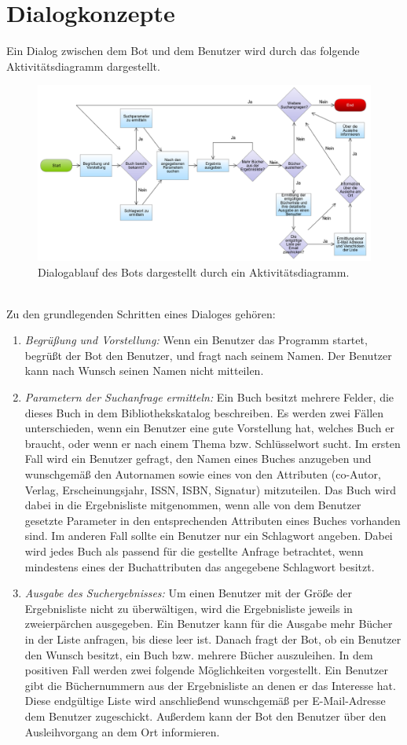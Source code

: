 \documentclass[12pt,a4paper]{scrartcl}
\begin{document}
\section{Dialogkonzepte}
Ein Dialog zwischen dem Bot und dem Benutzer wird durch das folgende Aktivitätsdiagramm dargestellt.\\
\begin{figure}[h]
\centering
  \includegraphics[width=\linewidth]{presbibo1.png}
  \caption{Dialogablauf des Bots dargestellt durch ein Aktivitätsdiagramm.}
\end{figure}
\\
Zu den grundlegenden Schritten eines Dialoges gehören:
\begin{enumerate}
	\item \textit{Begrüßung und Vorstellung:} Wenn ein Benutzer das Programm startet, begrüßt der Bot den Benutzer, und fragt nach seinem Namen. Der Benutzer kann nach Wunsch seinen Namen nicht mitteilen.
	\item \textit{Parametern der Suchanfrage ermitteln:} Ein Buch besitzt mehrere Felder, die dieses Buch in dem Bibliothekskatalog beschreiben. Es werden zwei Fällen unterschieden, wenn ein Benutzer eine gute Vorstellung hat, welches Buch er braucht, oder wenn er nach einem Thema bzw. Schlüsselwort sucht. Im ersten Fall wird ein Benutzer gefragt, den Namen eines Buches anzugeben und wunschgemäß den Autornamen sowie eines von den Attributen (co-Autor, Verlag, Erscheinungsjahr, ISSN, ISBN, Signatur) mitzuteilen. Das Buch wird dabei in die Ergebnisliste mitgenommen, wenn alle von dem Benutzer gesetzte Parameter in den entsprechenden Attributen eines Buches vorhanden sind. Im anderen Fall sollte ein Benutzer nur ein Schlagwort angeben. Dabei wird jedes Buch als passend für die gestellte Anfrage betrachtet, wenn mindestens eines der Buchattributen das angegebene Schlagwort besitzt.
	\item \textit{Ausgabe des Suchergebnisses:} Um einen Benutzer mit der Größe der Ergebnisliste nicht zu überwältigen, wird die Ergebnisliste jeweils in zweierpärchen ausgegeben. Ein Benutzer kann für die Ausgabe mehr Bücher in der Liste anfragen, bis diese leer ist. Danach fragt der Bot, ob ein Benutzer den Wunsch besitzt, ein Buch bzw. mehrere Bücher auszuleihen. In dem positiven Fall werden zwei folgende Möglichkeiten vorgestellt. Ein Benutzer gibt die Büchernummern aus der Ergebnisliste an denen er das Interesse hat. Diese endgültige Liste wird anschließend wunschgemäß per E-Mail-Adresse dem Benutzer zugeschickt. Außerdem kann der Bot den Benutzer über den Ausleihvorgang an dem Ort informieren.
\end{enumerate}
\end{document}
